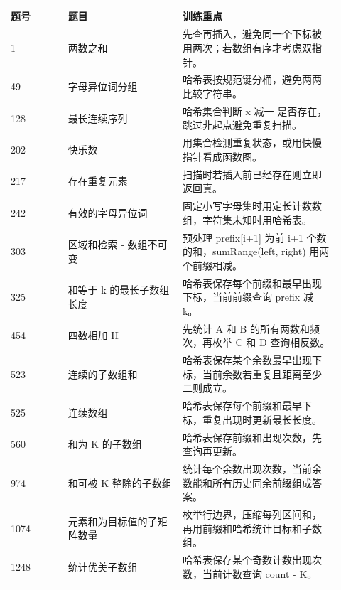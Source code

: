 
\begin{longtable}{@{}p{0.16\linewidth}p{0.32\linewidth}p{0.44\linewidth}@{}}
\toprule
题号 & 题目 & 训练重点\\
\midrule
\endhead
1 & 两数之和 & 先查再插入，避免同一个下标被用两次；若数组有序才考虑双指针。\\
49 & 字母异位词分组 & 哈希表按规范键分桶，避免两两比较字符串。\\
128 & 最长连续序列 & 哈希集合判断 x 减一 是否存在，跳过非起点避免重复扫描。\\
202 & 快乐数 & 用集合检测重复状态，或用快慢指针看成函数图。\\
217 & 存在重复元素 & 扫描时若插入前已经存在则立即返回真。\\
242 & 有效的字母异位词 & 固定小写字母集时用定长计数数组，字符集未知时用哈希表。\\
303 & 区域和检索 - 数组不可变 & 预处理 prefix[i+1] 为前 i+1 个数的和，sumRange(left, right) 用两个前缀相减。\\
325 & 和等于 k 的最长子数组长度 & 哈希表保存每个前缀和最早出现下标，当前前缀查询 prefix 减 k。\\
454 & 四数相加 II & 先统计 A 和 B 的所有两数和频次，再枚举 C 和 D 查询相反数。\\
523 & 连续的子数组和 & 哈希表保存某个余数最早出现下标，当前余数若重复且距离至少二则成立。\\
525 & 连续数组 & 哈希表保存每个前缀和最早下标，重复出现时更新最长长度。\\
560 & 和为 K 的子数组 & 哈希表保存前缀和出现次数，先查询再更新。\\
974 & 和可被 K 整除的子数组 & 统计每个余数出现次数，当前余数能和所有历史同余前缀组成答案。\\
1074 & 元素和为目标值的子矩阵数量 & 枚举行边界，压缩每列区间和，再用前缀和哈希统计目标和子数组。\\
1248 & 统计优美子数组 & 哈希表保存某个奇数计数出现次数，当前计数查询 count - K。\\
\bottomrule
\end{longtable}



